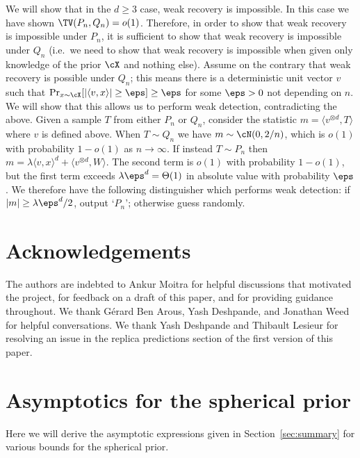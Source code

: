 \documentclass{article}
\begin{document}
We will show that in the $d \ge 3$ case, weak recovery is impossible. In this case we have shown $\TV(P_n,Q_n) = o(1)$. Therefore, in order to show that weak recovery is impossible under $P_n$, it is sufficient to show that weak recovery is impossible under $Q_n$ (i.e.\ we need to show that weak recovery is impossible when given only knowledge of the prior $\cX$ and nothing else). Assume on the contrary that weak recovery is possible under $Q_n$; this means there is a deterministic unit vector $v$ such that $\Pr_{x \sim \cX} [|\langle v,x \rangle| \ge \eps] \ge \eps$ for some $\eps > 0$ not depending on $n$. We will show that this allows us to perform weak detection, contradicting the above. Given a sample $T$ from either $P_n$ or $Q_n$, consider the statistic $m = \langle v^{\otimes d},T \rangle$ where $v$ is defined above. When $T \sim Q_n$ we have $m \sim \cN(0,2/n)$, which is $o(1)$ with probability $1-o(1)$ as $n\to\infty$. If instead $T \sim P_n$ then $m = \lambda \langle v,x \rangle^d + \langle v^{\otimes d},W \rangle$. The second term is $o(1)$ with probability $1-o(1)$, but the first term exceeds $\lambda \eps^d = \Theta(1)$ in absolute value with probability $\eps$. We therefore have the following distinguisher which performs weak detection: if $|m| \ge \lambda \eps^d/2$, output `$P_n$'; otherwise guess randomly.









\section*{Acknowledgements}
The authors are indebted to Ankur Moitra for helpful discussions that motivated the project, for feedback on a draft of this paper, and for providing guidance throughout. We thank G\'erard Ben Arous, Yash Deshpande, and Jonathan Weed for helpful conversations. We thank Yash Deshpande and Thibault Lesieur for resolving an issue in the replica predictions section of the first version of this paper.






\appendix


\section{Asymptotics for the spherical prior}\label{app:asymptotics}

Here we will derive the asymptotic expressions given in Section~\ref{sec:summary} for various bounds for the spherical prior.
\end{document}
